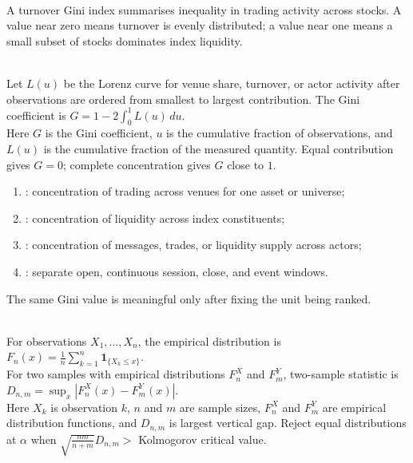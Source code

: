 \documentclass[a4paper,oneside,openany]{book}
\begin{document}
\begin{definition} \\
A turnover Gini index summarises inequality in trading activity across stocks. A value near zero means turnover is evenly distributed; a value near one means a small subset of stocks dominates index liquidity.
\end{definition}

\begin{model} \\
Let $L(u)$ be the Lorenz curve for venue share, turnover, or actor activity after observations are ordered from smallest to largest contribution. The Gini coefficient is $G=1-2\int_0^1 L(u)\,du$.\\
Here $G$ is the Gini coefficient, $u$ is the cumulative fraction of observations, and $L(u)$ is the cumulative fraction of the measured quantity. Equal contribution gives $G=0$; complete concentration gives $G$ close to $1$.
\end{model}

\begin{taxonomy} 
\begin{enumerate}[label=\roman*.]
\setlength{\itemsep}{0pt}
\item {}: concentration of trading across venues for one asset or universe;
\item {}: concentration of liquidity across index constituents;
\item {}: concentration of messages, trades, or liquidity supply across actors;
\item {}: separate open, continuous session, close, and event windows.
\end{enumerate}
The same Gini value is meaningful only after fixing the unit being ranked.
\end{taxonomy}

\begin{model} \\
For observations $X_1,\ldots,X_n$, the empirical distribution is $F_n(x)=\frac{1}{n}\sum_{k=1}^{n}\mathbf{1}_{\{X_k\leq x\}}$.\\
For two samples with empirical distributions $F_n^X$ and $F_m^Y$, two-sample statistic is $D_{n,m}=\sup_x\left|F_n^X(x)-F_m^Y(x)\right|$.\\
Here $X_k$ is observation $k$, $n$ and $m$ are sample sizes, $F_n^X$ and $F_m^Y$ are empirical distribution functions, and $D_{n,m}$ is largest vertical gap. Reject equal distributions at $\alpha$ when $\sqrt{\frac{nm}{n+m}}D_{n,m} > $ Kolmogorov critical value.
\end{model}
\end{document}
